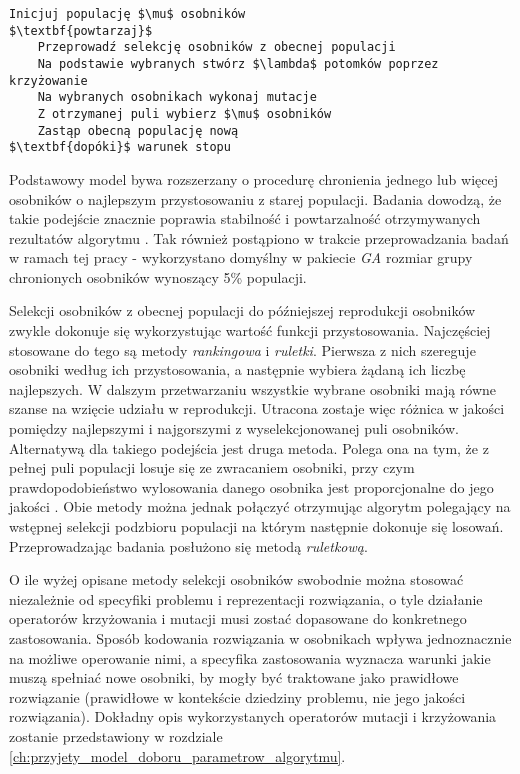 \begin{lstlisting}[caption=Podstawowy schemat algorytmu genetycznego, label=lst:genetic_algorithm_psedocode, mathescape]
Inicjuj populację $\mu$ osobników
$\textbf{powtarzaj}$
    Przeprowadź selekcję osobników z obecnej populacji
    Na podstawie wybranych stwórz $\lambda$ potomków poprzez krzyżowanie
    Na wybranych osobnikach wykonaj mutacje
    Z otrzymanej puli wybierz $\mu$ osobników
    Zastąp obecną populację nową
$\textbf{dopóki}$ warunek stopu
\end{lstlisting}
\par
Podstawowy model bywa rozszerzany o procedurę chronienia jednego lub więcej osobników o najlepszym przystosowaniu z starej populacji. Badania dowodzą, że takie podejście znacznie poprawia stabilność i powtarzalność otrzymywanych rezultatów algorytmu \cite{baluja1995removing}. Tak również postąpiono w trakcie przeprowadzania badań w ramach tej pracy - wykorzystano domyślny w pakiecie \emph{GA} rozmiar grupy chronionych osobników wynoszący 5\% populacji.
\par
Selekcji osobników z obecnej populacji do późniejszej reprodukcji osobników zwykle dokonuje się wykorzystując wartość funkcji przystosowania. Najczęściej stosowane do tego są metody \emph{rankingowa} i \emph{ruletki}. Pierwsza z nich szereguje osobniki według ich przystosowania, a następnie wybiera żądaną ich liczbę najlepszych. W dalszym przetwarzaniu wszystkie wybrane osobniki mają równe szanse na wzięcie udziału w reprodukcji. Utracona zostaje więc różnica w jakości pomiędzy najlepszymi i najgorszymi z wyselekcjonowanej puli osobników. Alternatywą dla takiego podejścia jest druga metoda. Polega ona na tym, że z pełnej puli populacji losuje się ze zwracaniem osobniki, przy czym prawdopodobieństwo wylosowania danego osobnika jest proporcjonalne do jego jakości \cite{sudholt2008computational}. Obie metody można jednak połączyć otrzymując algorytm polegający na wstępnej selekcji podzbioru populacji na którym następnie dokonuje się losowań. Przeprowadzając badania posłużono się metodą \emph{ruletkową}.
\par
O ile wyżej opisane metody selekcji osobników swobodnie można stosować niezależnie od specyfiki problemu i reprezentacji rozwiązania, o tyle działanie operatorów krzyżowania i mutacji musi zostać dopasowane do konkretnego zastosowania. Sposób kodowania rozwiązania w osobnikach wpływa jednoznacznie na możliwe operowanie nimi, a specyfika zastosowania wyznacza warunki jakie muszą spełniać nowe osobniki, by mogły być traktowane jako prawidłowe rozwiązanie (prawidłowe w kontekście dziedziny problemu, nie jego jakości rozwiązania). Dokładny opis wykorzystanych operatorów mutacji i krzyżowania zostanie przedstawiony w rozdziale \ref{ch:przyjety_model_doboru_parametrow_algorytmu}.
\par

